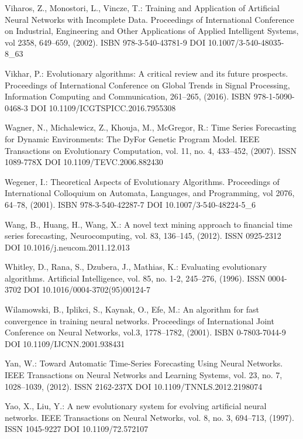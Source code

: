 \begin{thebibliography}{99.}
 Viharos, Z., Monostori, L., Vincze, T.: Training and Application of Artificial Neural Networks with Incomplete Data. Proceedings of International Conference on Industrial, Engineering and Other Applications of Applied Intelligent Systems, vol 2358, 649--659, (2002). ISBN 978-3-540-43781-9 DOI 10.1007/3-540-48035-8\_63

 Vikhar, P.: Evolutionary algorithms: A critical review and its future prospects. Proceedings of International Conference on Global Trends in Signal Processing, Information Computing and Communication, 261--265, (2016). ISBN 978-1-5090-0468-3 DOI 10.1109/ICGTSPICC.2016.7955308

 Wagner, N., Michalewicz, Z., Khouja, M., McGregor, R.: Time Series Forecasting for Dynamic Environments: The DyFor Genetic Program Model. IEEE Transactions on Evolutionary Computation, vol. 11, no. 4, 433--452, (2007). ISSN 1089-778X DOI 10.1109/TEVC.2006.882430

 Wegener, I.: Theoretical Aspects of Evolutionary Algorithms. Proceedings of International Colloquium on Automata, Languages, and Programming, vol 2076, 64--78, (2001). ISBN 978-3-540-42287-7 DOI 10.1007/3-540-48224-5\_6

 Wang, B., Huang, H., Wang, X.: A novel text mining approach to financial time series forecasting, Neurocomputing, vol. 83, 136--145, (2012). ISSN 0925-2312 DOI 10.1016/j.neucom.2011.12.013

 Whitley, D., Rana, S., Dzubera, J., Mathias, K.: Evaluating evolutionary algorithms. Artificial Intelligence, vol. 85, no. 1-2, 245--276, (1996). ISSN 0004-3702 DOI 10.1016/0004-3702(95)00124-7

 Wilamowski, B., Iplikci, S., Kaynak, O., Efe, M.: An algorithm for fast convergence in training neural networks. Proceedings of International Joint Conference on Neural Networks, vol.3, 1778--1782, (2001). ISBN 0-7803-7044-9 DOI 10.1109/IJCNN.2001.938431

 Yan, W.: Toward Automatic Time-Series Forecasting Using Neural Networks. IEEE Transactions on Neural Networks and Learning Systems, vol. 23, no. 7, 1028--1039, (2012). ISSN 2162-237X DOI 10.1109/TNNLS.2012.2198074

 Yao, X., Liu, Y.: A new evolutionary system for evolving artificial neural networks. IEEE Transactions on Neural Networks, vol. 8, no. 3, 694--713, (1997). ISSN 1045-9227 DOI 10.1109/72.572107


\end{thebibliography}
